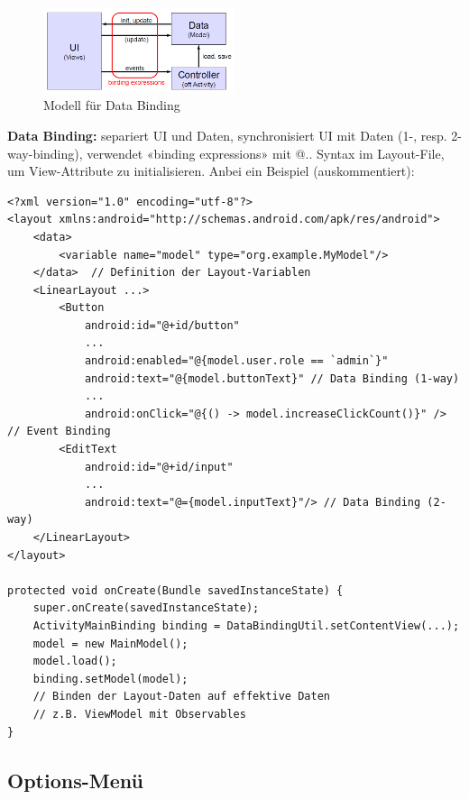 \documentclass[a4paper]{article}
\begin{document}
\begin{figure}[htb!]
	\centering
	\includegraphics[width=0.5\textwidth]{img/data_binding_model.png}
	\caption{Modell für Data Binding}
\end{figure}
\noindent
\textbf{Data Binding:} separiert UI und Daten, synchronisiert UI mit Daten (1-, resp. 2-way-binding), verwendet «binding expressions» mit @{..} Syntax im Layout-File, um View-Attribute zu initialisieren. Anbei ein Beispiel (auskommentiert):

\begin{lstlisting}
<?xml version="1.0" encoding="utf-8"?> 
<layout xmlns:android="http://schemas.android.com/apk/res/android"> 
	<data> 
		<variable name="model" type="org.example.MyModel"/> 
	</data>  // Definition der Layout-Variablen
	<LinearLayout ...> 
		<Button 
			android:id="@+id/button" 
			...
			android:enabled="@{model.user.role == `admin`}" 
			android:text="@{model.buttonText}" // Data Binding (1-way)
			...
			android:onClick="@{() -> model.increaseClickCount()}" /> // Event Binding
		<EditText 
			android:id="@+id/input"
			...
			android:text="@={model.inputText}"/> // Data Binding (2-way)
	</LinearLayout> 
</layout>

protected void onCreate(Bundle savedInstanceState) { 
	super.onCreate(savedInstanceState); 
	ActivityMainBinding binding = DataBindingUtil.setContentView(...); 
	model = new MainModel();
	model.load(); 
	binding.setModel(model);
	// Binden der Layout-Daten auf effektive Daten
	// z.B. ViewModel mit Observables
}
\end{lstlisting}
\newpage

\subsection{Options-Menü}
\end{document}
